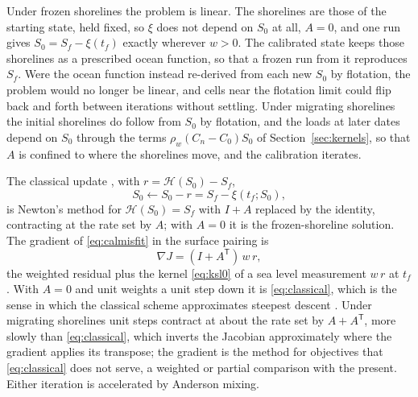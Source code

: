 \documentclass[11pt,a4paper]{article}
\numberwithin{equation}{section}
\begin{document}
Under frozen shorelines the problem is linear. The shorelines are those of the
starting state, held fixed, so $\xi$ does not depend on $S_{0}$ at all, $A=0$,
and one run gives $S_{0} = S_{f} - \xi(t_{f})$ exactly wherever $w>0$. The
calibrated state keeps those shorelines as a prescribed ocean function, so
that a frozen run from it reproduces $S_{f}$. Were the ocean function instead
re-derived from each new $S_{0}$ by flotation, the problem would no longer be
linear, and cells near the flotation limit could flip back and forth between
iterations without settling. Under migrating shorelines the initial shorelines
do follow from $S_{0}$ by flotation, and the loads at later dates depend on
$S_{0}$ through the terms $\rho_{w}(C_{n}-C_{0})S_{0}$ of Section~\ref{sec:kernels},
so that $A$ is confined to where the shorelines move, and the calibration
iterates.

The classical update \citep{KendallEtAl2005}, with $r = \mathcal{H}(S_{0}) - S_{f}$,
\begin{equation}
S_{0} \leftarrow S_{0} - r = S_{f} - \xi(t_{f};S_{0}),
\label{eq:classical}
\end{equation}
is Newton's method for $\mathcal{H}(S_{0}) = S_{f}$ with $I + A$ replaced by the
identity, contracting at the rate set by $A$; with $A=0$ it is the
frozen-shoreline solution. The gradient of \eqref{eq:calmisfit} in the surface
pairing is
\begin{equation}
\nabla J = (I + A^{\mathsf T})\,w\,r,
\end{equation}
the weighted residual plus the kernel \eqref{eq:ksl0} of a sea level
measurement $w\,r$ at $t_{f}$ \citep[eq.~87]{YuEtAl2025}. With $A=0$ and unit
weights a unit step down it is \eqref{eq:classical}, which is the
sense in which the classical scheme approximates steepest descent
\citep[Section 3.9]{YuEtAl2025}. Under migrating shorelines unit steps contract
at about the rate set by $A + A^{\mathsf T}$, more slowly than \eqref{eq:classical},
which inverts the Jacobian approximately where the gradient applies its
transpose; the gradient is the method for objectives that \eqref{eq:classical}
does not serve, a weighted or partial comparison with the present. Either
iteration is accelerated by Anderson mixing.
\end{document}
